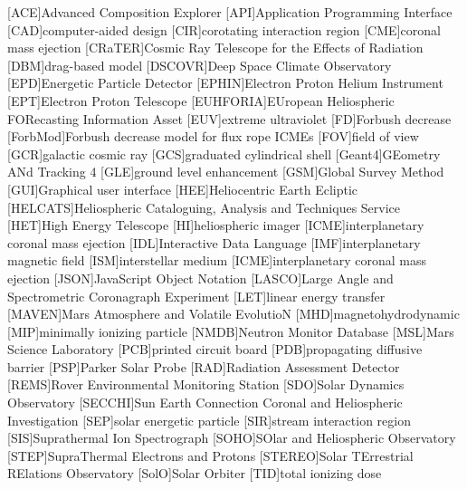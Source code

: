 	\begin{acronym}\itemsep0pt
	[ACE]{Advanced Composition Explorer}
	[API]{Application Programming Interface}
	[CAD]{computer-aided design}
	[CIR]{corotating interaction region}
	[CME]{coronal mass ejection}
	[CRaTER]{Cosmic Ray Telescope for the Effects of Radiation}
	[DBM]{drag-based model}
	[DSCOVR]{Deep Space Climate Observatory}
	[EPD]{Energetic Particle Detector}
	[EPHIN]{Electron Proton Helium Instrument}
	[EPT]{Electron Proton Telescope}
    [EUHFORIA]{EUropean Heliospheric FORecasting Information Asset}
	[EUV]{extreme ultraviolet}
	[FD]{Forbush decrease}
	[ForbMod]{Forbush decrease model for flux rope ICMEs}
	[FOV]{field of view}
	[GCR]{galactic cosmic ray}
	[GCS]{graduated cylindrical shell}
	[Geant4]{GEometry ANd Tracking 4}
	[GLE]{ground level enhancement}
	[GSM]{Global Survey Method}
	[GUI]{Graphical user interface}
	[HEE]{Heliocentric Earth Ecliptic}
	[HELCATS]{Heliospheric Cataloguing, Analysis and Techniques Service}
	[HET]{High Energy Telescope}
	[HI]{heliospheric imager}
	[ICME]{interplanetary coronal mass ejection}
	[IDL]{Interactive Data Language}
	[IMF]{interplanetary magnetic field}
    [ISM]{interstellar medium}
	[ICME]{interplanetary coronal mass ejection}
	[JSON]{JavaScript Object Notation}
    [LASCO]{Large Angle and Spectrometric Coronagraph Experiment}
	[LET]{linear energy transfer}
	[MAVEN]{Mars Atmosphere and Volatile EvolutioN}
	[MHD]{magnetohydrodynamic}
	[MIP]{minimally ionizing particle}
	[NMDB]{Neutron Monitor Database}
	[MSL]{Mars Science Laboratory}
	[PCB]{printed circuit board}
	[PDB]{propagating diffusive barrier}
	[PSP]{Parker Solar Probe}
	[RAD]{Radiation Assessment Detector}
	[REMS]{Rover Environmental Monitoring Station}
	[SDO]{Solar Dynamics Observatory}
    [SECCHI]{Sun Earth Connection Coronal and Heliospheric Investigation}
	[SEP]{solar energetic particle}
	[SIR]{stream interaction region}
	[SIS]{Suprathermal Ion Spectrograph}
	[SOHO]{SOlar and Heliospheric Observatory}
	[STEP]{SupraThermal Electrons and Protons}
	[STEREO]{Solar TErrestrial RElations Observatory}
	[SolO]{Solar Orbiter}
	[TID]{total ionizing dose}
	\end{acronym}
	

\endgroup

\cleardoublepage